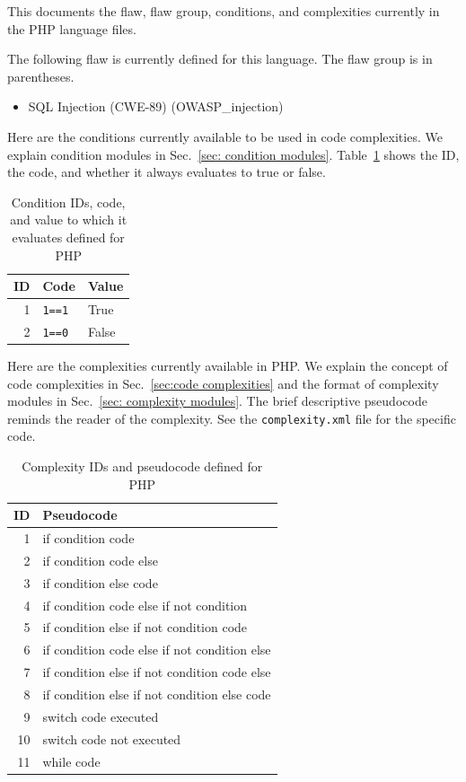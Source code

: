 \begin{appendices}
This documents the flaw, flaw group, conditions, and complexities currently in the
PHP language files.

The following flaw is currently defined for this language.  The flaw group is in
parentheses.
\begin{itemize}
    \item SQL Injection (CWE-89) (OWASP\_injection)
\end{itemize}

Here are the conditions currently available to be used in code complexities.
We explain condition modules in Sec.~\ref{sec: condition modules}.
Table~\ref{tab:condition IDs for PHP} shows the ID, the code, and whether it
always evaluates to true or false.

\begin{table}[H]
\centering
\caption{Condition IDs, code, and value to which it evaluates defined for
  PHP}
\begin{tabular}{|r|l|l|}
\hline
\textbf{ID} & \textbf{Code} & \textbf{Value} \\
\hline
1 & \verb|1==1| & True \\
\hline
2 & \verb|1==0| & False \\
\hline
\end{tabular}
\label{tab:condition IDs for PHP}
\end{table}

\newpage

Here are the complexities currently available in PHP.
We explain the concept of code complexities in Sec.~\ref{sec:code complexities} and
the format of complexity modules in Sec.~\ref{sec: complexity modules}.
The brief descriptive pseudocode reminds the reader of the complexity.
See the \verb|complexity.xml| file for the specific code.

\begin{table}[H]
\centering
\caption{Complexity IDs and pseudocode defined for PHP}
\begin{tabular}{|r|l|}
\hline
\textbf{ID} & \textbf{Pseudocode} \\
\hline
 1 & if condition code \\
\hline
 2 & if condition code else \\
\hline
 3 & if condition else code \\
\hline
 4 & if condition code else if not condition \\
\hline
 5 & if condition else if not condition code \\
\hline
 6 & if condition code else if not condition else \\
\hline
 7 & if condition else if not condition code else \\
 \hline
 8 & if condition else if not condition else code \\
\hline
 9 & switch code executed \\
\hline
10 & switch code not executed \\
\hline
11 & while code \\
\hline


\end{tabular}
\end{table}
\end{appendices}

